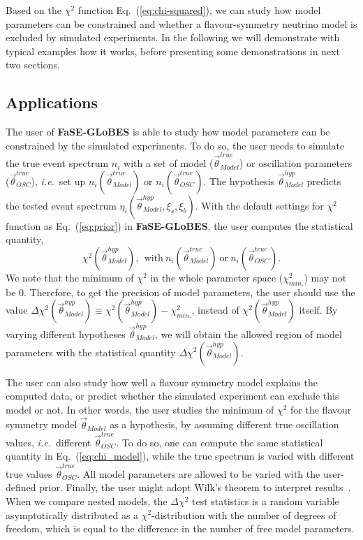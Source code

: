 \documentclass[aps,prd,nofootinbib,preprint]{revtex4}
\begin{document}
Based on the $\chi^2$ function Eq.~(\ref{eq:chi-squared}), we can study how model parameters can be constrained and whether a flavour-symmetry neutrino model is excluded by simulated experiments. In the following we will demonstrate with typical examples how it works, before presenting some demonstrations in next two sections.

\subsection*{Applications}

The user of \textbf{FaSE-GLoBES} is able to study how model parameters can be constrained by the simulated experiments. To do so, the user needs to simulate the true event spectrum $n_i$ with a set of model ($\vec{\theta}_{Model}^{true}$) or oscillation parameters ($\vec{\theta}_{OSC}^{true}$), \textit{i.e.}~set up $n_i(\vec{\theta}_{Model}^{true})$ or $n_i(\vec{\theta}_{OSC}^{true})$. The hypothesis $\vec{\theta}_{Model}^{hyp}$ predicts the tested event spectrum $\eta_i(\vec{\theta}_{Model}^{hyp},\xi_s,\xi_b)$. With the default settings for $\chi^2$ function as Eq.~(\ref{eq:prior}) in \textbf{FaSE-GLoBES}, the user computes the statistical quantity,
\begin{equation}\label{eq:chi_model}
\chi^2(\vec{\theta}_{Model}^{hyp}),~~\text{with}~n_i(\vec{\theta}_{Model}^{true})~\text{or}~n_i(\vec{\theta}_{OSC}^{true}).
\end{equation}
%
We note that the minimum of $\chi^2$ in the whole parameter space ($\chi^2_{min.}$) may not be $0$. Therefore, to get the precision of model parameters, the user should use the value $\Delta\chi^2(\vec{\theta}_{Model}^{hyp})\equiv \chi^2(\vec{\theta}_{Model}^{hyp})-\chi^2_{min.}$, instead of $\chi^2(\vec{\theta}_{Model}^{hyp})$ itself. By varying different hypotheses $\vec{\theta}_{Model}^{hyp}$, we will obtain the allowed region of model parameters with the statistical quantity $\Delta\chi^2(\vec{\theta}_{Model}^{hyp})$. 

The user can also study how well a flavour symmetry model explains the computed data, or predict whether the simulated experiment can exclude this model or not. In other words, the user studies the minimum of $\chi^2$ for the flavour symmetry model $\vec{\theta}_{Model}$ as a hypothesis, by assuming different true oscillation values, \textit{i.e.}~different $\vec{\theta}^{true}_{OSC}$. To do so, one can compute the same statistical quantity in Eq.~(\ref{eq:chi_model}), while the true spectrum is varied with different true values $\vec{\theta}_{OSC}^{true}$. All model parameters are allowed to be varied with the user-defined prior.
%
Finally, the user might adopt Wilk's theorem to interpret results~\cite{Wilks:1938dza}. When we compare nested models, the $\Delta \chi^2$ test statistics is a random variable asymptotically distributed as a $\chi^2$-distribution with the number of degrees of freedom, which is equal to the difference in the number of free model parameters. 
\end{document}
